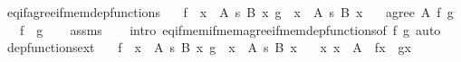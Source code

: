 \begin{isabellebody}
\ eq{\isacharunderscore}{\kern0pt}if{\isacharunderscore}{\kern0pt}agree{\isacharunderscore}{\kern0pt}if{\isacharunderscore}{\kern0pt}mem{\isacharunderscore}{\kern0pt}dep{\isacharunderscore}{\kern0pt}functions{\isacharcolon}{\kern0pt}\isanewline
\ \ \ {\isachardoublequoteopen}f\ {\isasymin}\ {\isacharparenleft}{\kern0pt}x\ {\isasymin}\ A{\isacharparenright}{\kern0pt}\ {\isasymrightarrow}s\ {\isacharparenleft}{\kern0pt}B\ x{\isacharparenright}{\kern0pt}{\isachardoublequoteclose}\ {\isachardoublequoteopen}g\ {\isasymin}\ {\isacharparenleft}{\kern0pt}x\ {\isasymin}\ A{\isacharparenright}{\kern0pt}\ {\isasymrightarrow}s\ {\isacharparenleft}{\kern0pt}B\ x{\isacharparenright}{\kern0pt}{\isachardoublequoteclose}\isanewline
\ \ \ {\isachardoublequoteopen}agree\ A\ {\isacharbraceleft}{\kern0pt}f{\isacharcomma}{\kern0pt}\ g{\isacharbraceright}{\kern0pt}{\isachardoublequoteclose}\isanewline
\ \ \ {\isachardoublequoteopen}f\ {\isacharequal}{\kern0pt}\ g{\isachardoublequoteclose}\isanewline
%
\isadelimproof
\ \ %
\endisadelimproof
%
\isatagproof
{}\isamarkupfalse%
\ assms\isanewline
\ \ \isamarkupfalse%
\ {\isacharparenleft}{\kern0pt}intro\ eq{\isacharunderscore}{\kern0pt}if{\isacharunderscore}{\kern0pt}mem{\isacharunderscore}{\kern0pt}if{\isacharunderscore}{\kern0pt}mem{\isacharunderscore}{\kern0pt}agree{\isacharunderscore}{\kern0pt}if{\isacharunderscore}{\kern0pt}mem{\isacharunderscore}{\kern0pt}dep{\isacharunderscore}{\kern0pt}functions{\isacharbrackleft}{\kern0pt}of\ {\isachardoublequoteopen}{\isacharbraceleft}{\kern0pt}f{\isacharcomma}{\kern0pt}\ g{\isacharbraceright}{\kern0pt}{\isachardoublequoteclose}{\isacharbrackright}{\kern0pt}{\isacharparenright}{\kern0pt}\ auto%
\endisatagproof
{\isafoldproof}%
%
\isadelimproof
\isanewline
%
\endisadelimproof
\isanewline
{}\isamarkupfalse%
\ dep{\isacharunderscore}{\kern0pt}functions{\isacharunderscore}{\kern0pt}ext{\isacharcolon}{\kern0pt}\isanewline
\ \ \ {\isachardoublequoteopen}f\ {\isasymin}\ {\isacharparenleft}{\kern0pt}x\ {\isasymin}\ A{\isacharparenright}{\kern0pt}\ {\isasymrightarrow}s\ {\isacharparenleft}{\kern0pt}B\ x{\isacharparenright}{\kern0pt}{\isachardoublequoteclose}\ {\isachardoublequoteopen}g\ {\isasymin}\ {\isacharparenleft}{\kern0pt}x\ {\isasymin}\ A{\isacharparenright}{\kern0pt}\ {\isasymrightarrow}s\ {\isacharparenleft}{\kern0pt}B\ x{\isacharparenright}{\kern0pt}{\isachardoublequoteclose}\isanewline
\ \ \ {\isachardoublequoteopen}{\isasymAnd}x{\isachardot}{\kern0pt}\ x\ {\isasymin}\ A\ {\isasymLongrightarrow}\ f{\isacharbackquote}{\kern0pt}x\ {\isacharequal}{\kern0pt}\ g{\isacharbackquote}{\kern0pt}x{\isachardoublequoteclose}\isanewline

\end{isabellebody}
